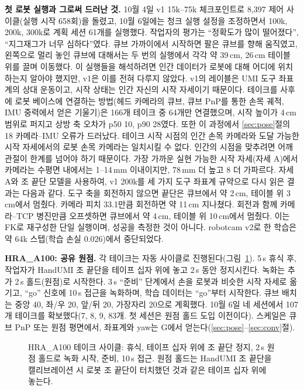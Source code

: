 \documentclass[conference,10pt]{IEEEtran}
\newcommand{\mm}{\,mm\xspace}
\begin{document}
\textbf{첫 로봇 실행과 그로써 드러난 것.} 10월 4일 v1 15k--75k 체크포인트로 8{,}397 제어 사이클(실행 시작 658회)을 돌렸고, 10월 6일에는
청크 실행 설정을 조정하면서 100k, 200k, 300k로 계획 세션 61개를 실행했다. 작업자의 평가는 ``정확도가 많이 떨어졌다'', ``지그재그가
너무 심하다''였다. 큐브 가까이에서 시작하면 팔은 큐브를 향해 움직였고, 왼쪽으로 멀리 놓인 큐브에 대해서는 두 번의 실행에서 각각 약
39\,cm, 26\,cm 테이블 위를 끌며 이동했다. 이 실행들을 해석하려면 인간 데이터가 로봇에 대해 어디에 위치하는지 알아야 했지만, v1은
이를 전혀 다루지 않았다. v1의 레이블은 UMI 도구 좌표계의 상대 운동이고, 시작 상태는 인간 자신의 시작 자세이기 때문이다. 테이크를
사후에 로봇 베이스에 연결하는 방법(헤드 카메라의 큐브, 큐브 PnP를 통한 손목 궤적, IMU 중력에서 얻은 기울기)은 166개 테이크 중 64개만
연결했으며, 시작 높이가 4\,cm 범위로 퍼지고 상방 축 오차가 p50 10\textdegree, p90 28\textdegree{}였다. 또한 이 과정에서
\ref{sec:pose}절의 18\textdegree{} 카메라--IMU 오류가 드러났다. 테이크 시작 시점의 인간 손목 카메라와 도달 가능한 시작 자세에서의 로봇
손목 카메라는 일치시킬 수 없다. 인간의 시점을 맞추려면 어깨 관절이 한계를 넘어야 하기 때문이다. 가장 가까운 실현 가능한 시작 자세(자세
A)에서 카메라는 수평면 내에서는 1--14\mm{} 이내이지만, 78\mm{} 더 높고 8\textdegree{} 더 가파르다. 자세 A와 조 끝단 모델을 사용하여,
v1 200k를 세 가지 도구 좌표계 규약으로 다시 읽은 결과는 다음과 같다. 도구 축을 회전하지 않으면 끝단은 큐브에서 약 2\,cm, 테이블 위
3\,cm에서 멈췄다. 카메라 피치 33.1\textdegree{}만큼 회전하면 약 11\,cm 지나쳤다. 회전과 함께 카메라--TCP 병진만큼 오프셋하면 큐브에서
약 4\,cm, 테이블 위 10\,cm에서 멈췄다. 이는 FK로 재구성한 단일 실행이며, 성공을 측정한 것이 아니다. robotcam v2로 한 학습은 약 64k
스텝(학습 손실 0.026)에서 중단되었다.

\textbf{HRA\_A100: 공유 원점.} 각 테이크는 자동 사이클로 진행된다(그림~\ref{fig:protocol}). 5\,s 휴식 후, 작업자가 HandUMI 조 끝단을
테이프 십자 위에 놓고 2\,s 동안 정지시킨다. 녹화는 추가 2\,s 홀드(원점)로 시작한다. 3\,s ``준비'' 단계에서 손을 로봇과 비슷한 시작
자세로 옮기고, ``go'' 신호에 10\,s 접근을 녹화하며, 학습 데이터는 ``go''부터 시작한다. 큐브 배치는 중앙 40, 좌/우 20, 앞/뒤 20,
가장자리 20으로 계획했다. 10월 6일 네 세션에서 107개 테이크를 확보했다(7, 8, 9, 83개. 첫 세션은 원점 홀드 도입 이전이다). 스케일은
큐브 PnP 또는 원점 평면에서, 좌표계와 yaw는 G에서 얻는다(\ref{sec:pose}--\ref{sec:conv}절).

\begin{figure}[t]
\centering
{}
\caption{HRA\_A100 테이크 사이클: 휴식, 테이프 십자 위에 조 끝단 정지, 2\,s 원점 홀드로 녹화 시작, 준비, 10\,s 접근.
원점 홀드는 HandUMI 조 끝단을 캘리브레이션 시 로봇 조 끝단이 터치했던 것과 같은 테이프 십자 위에 놓는다.}
\label{fig:protocol}
\end{figure}
\end{document}
